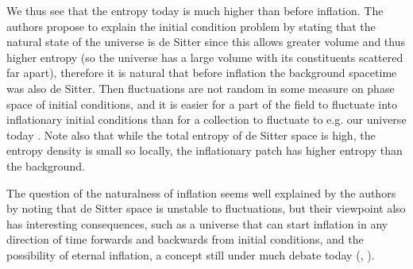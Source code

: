 We thus see that the entropy today is much higher than before inflation. The authors propose to explain the initial condition problem by stating that the natural state of the universe is de Sitter since this allows greater volume and thus higher entropy (so the universe has a large volume with its constituents scattered far apart), therefore it is natural that before inflation the background spacetime was also de Sitter. Then fluctuations are not random in some measure on phase space of initial conditions, and it is easier for a part of the field to fluctuate into inflationary initial conditions than for a collection to fluctuate to e.g. our universe today \cite{Carroll2004a}. Note also that while the total entropy of de Sitter space is high, the entropy density is small so locally, the inflationary patch has higher entropy than the background.\par 

The question of the naturalness of inflation seems well explained by the authors by noting that de Sitter space is unstable to fluctuations, but their viewpoint also has interesting consequences, such as a universe that can start inflation in any direction of time forwards and backwards from initial conditions, and the possibility of eternal inflation, a concept still under much debate today (\cite{Carroll2004}, \cite{Carroll2004a}).